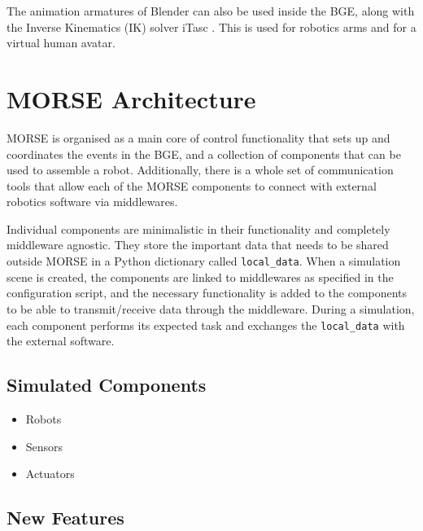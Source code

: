 \documentclass{llncs}
\begin{document}
The animation armatures of Blender can also be used inside the BGE, along with
the Inverse Kinematics (IK) solver iTasc \cite{iTaSC}. This is used for
robotics arms and for a virtual human avatar.

\section{MORSE Architecture}
\label{section:architecture}

MORSE is organised as a main core of control functionality that sets up and
coordinates the events in the BGE, and a collection of components that can be
used to assemble a robot. Additionally, there is a whole set of communication
tools that allow each of the MORSE components to connect with external robotics
software via middlewares.

Individual components are minimalistic in their functionality and  completely
middleware agnostic. They store the important data that needs to be shared
outside MORSE in a Python dictionary called \texttt{local\_data}.  When a
simulation scene is created, the components are linked to middlewares as
specified in the configuration script, and the necessary functionality is added
to the components to be able to transmit/receive data through the middleware.
During a simulation, each component performs its expected task and exchanges
the \texttt{local\_data} with the external software.

\subsection{Simulated Components}
\label{section:components}

\begin{itemize}
  \item Robots
  \item Sensors
  \item Actuators
\end{itemize}



\subsection{New Features}
\end{document}
